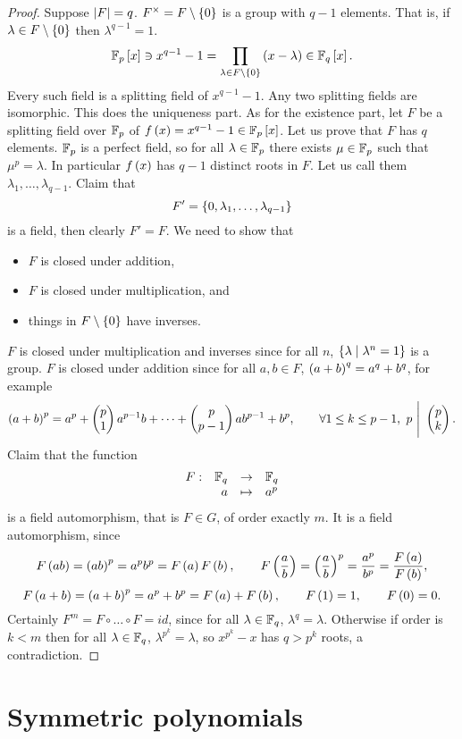\begin{proof}
Suppose $ \left\lvert F \right\rvert = q $. $ F^\times = F \setminus \left\{ 0 \right\} $ is a group with $ q - 1 $ elements. That is, if $ \lambda \in F \setminus \left\{ 0 \right\} $ then $ \lambda^{q - 1} = 1 $.
$$ \mathbb{F}_p\left[ x \right] \ni x^{q - 1} - 1 = \prod_{\lambda \in F \setminus \left\{ 0 \right\}} \left( x - \lambda \right) \in \mathbb{F}_q\left[ x \right]. $$
Every such field is a splitting field of $ x^{q - 1} - 1 $. Any two splitting fields are isomorphic. This does the uniqueness part. As for the existence part, let $ F $ be a splitting field over $ \mathbb{F}_p $ of $ f\left( x \right) = x^{q - 1} - 1 \in \mathbb{F}_p\left[ x \right] $. Let us prove that $ F $ has $ q $ elements. $ \mathbb{F}_p $ is a perfect field, so for all $ \lambda \in \mathbb{F}_p $ there exists $ \mu \in \mathbb{F}_p $ such that $ \mu^p = \lambda $. In particular $ f\left( x \right) $ has $ q - 1 $ distinct roots in $ F $. Let us call them $ \lambda_1, \dots, \lambda_{q - 1} $. Claim that
$$ F' = \left\{ 0, \lambda_1, \dots, \lambda_{q - 1} \right\} $$
is a field, then clearly $ F' = F $. We need to show that
\begin{itemize}
\item $ F $ is closed under addition,
\item $ F $ is closed under multiplication, and
\item things in $ F \setminus \left\{ 0 \right\} $ have inverses.
\end{itemize}
$ F $ is closed under multiplication and inverses since for all $ n $, $ \left\{ \lambda \mid \lambda^n = 1 \right\} $ is a group. $ F $ is closed under addition since for all $ a, b \in F $, $ \left( a + b \right)^q = a^q + b^q $, for example
$$ \left( a + b \right)^p = a^p + \begin{pmatrix} p \\ 1 \end{pmatrix}a^{p - 1}b + \dots + \begin{pmatrix} p \\ p - 1 \end{pmatrix}ab^{p - 1} + b^p, \qquad \forall 1 \le k \le p - 1, \ p \ \Bigg| \ \begin{pmatrix} p \\ k \end{pmatrix}. $$
Claim that the function
$$ \function[F]{\F_q}{\F_q}{a}{a^p} $$
is a field automorphism, that is $ F \in G $, of order exactly $ m $. It is a field automorphism, since
$$ F\left( ab \right) = \left( ab \right)^p = a^pb^p = F\left( a \right)F\left( b \right), \qquad F\left( \dfrac{a}{b} \right) = \left( \dfrac{a}{b} \right)^p = \dfrac{a^p}{b^p} = \dfrac{F\left( a \right)}{F\left( b \right)}, $$
$$ F\left( a + b \right) = \left( a + b \right)^p = a^p + b^p = F\left( a \right) + F\left( b \right), \qquad F\left( 1 \right) = 1, \qquad F\left( 0 \right) = 0. $$
Certainly $ F^m = F \circ \dots \circ F = id $, since for all $ \lambda \in \mathbb{F}_q $, $ \lambda^q = \lambda $. Otherwise if order is $ k < m $ then for all $ \lambda \in \mathbb{F}_q $, $ \lambda^{p^k} = \lambda $, so $ x^{p^k} - x $ has $ q > p^k $ roots, a contradiction.
\end{proof}

\pagebreak

\section{Symmetric polynomials}

